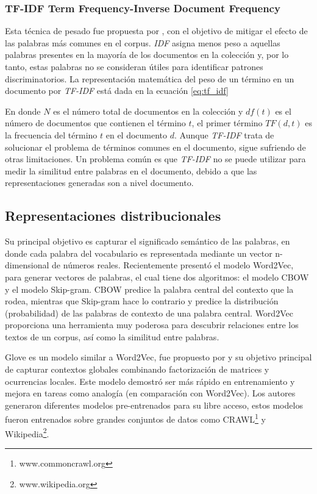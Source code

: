 \subsubsection{TF-IDF Term Frequency-Inverse Document Frequency} Esta técnica de pesado fue propuesta por \citep{jones1972statistical}, con el objetivo de mitigar el efecto de las palabras más comunes en el corpus. \textit{IDF} asigna menos peso a aquellas palabras presentes en la mayoría de los documentos en la colección y, por lo tanto, estas palabras no se consideran útiles para identificar patrones discriminatorios. La representación matemática del peso de un término en un documento por \textit{TF-IDF} está dada en la ecuación \ref{eq:tf_idf}



En donde $N$ es el número total de documentos en la colección y $df(t)$ es el número de documentos que contienen el término $t$, el primer término $TF(d,t)$ es la frecuencia del término $t$ en el documento $d$. Aunque \textit{TF-IDF} trata de solucionar el problema de términos comunes en el documento, sigue sufriendo de otras limitaciones. Un problema común es que \textit{TF-IDF} no se puede utilizar para medir la similitud entre palabras en el documento, debido a que las representaciones generadas son a nivel documento.

\subsection{Representaciones distribucionales}
Su principal objetivo es capturar el significado semántico de las palabras, en donde cada palabra del vocabulario es representada mediante un vector n-dimensional de números reales. Recientemente \citep{mikolov2013distributed} presentó el modelo Word2Vec, para generar vectores de palabras, el cual tiene dos algoritmos: el modelo CBOW y el modelo Skip-gram. CBOW  predice la palabra central del contexto que la rodea, mientras que Skip-gram hace lo contrario y predice la distribución (probabilidad) de las palabras de contexto de una palabra central. Word2Vec proporciona una herramienta muy poderosa para descubrir relaciones entre los textos de un corpus, así como la similitud entre palabras.

Glove es un modelo similar a Word2Vec, fue propuesto por \citep{pennington2014glove} y su objetivo principal de capturar contextos globales combinando factorización de matrices y ocurrencias locales. Este modelo demostró ser más rápido en entrenamiento y mejora en tareas como analogía (en comparación con Word2Vec). Los autores generaron diferentes modelos pre-entrenados para su libre acceso, estos modelos fueron entrenados sobre grandes conjuntos de datos como CRAWL\footnote{www.commoncrawl.org} y Wikipedia\footnote{www.wikipedia.org}.

